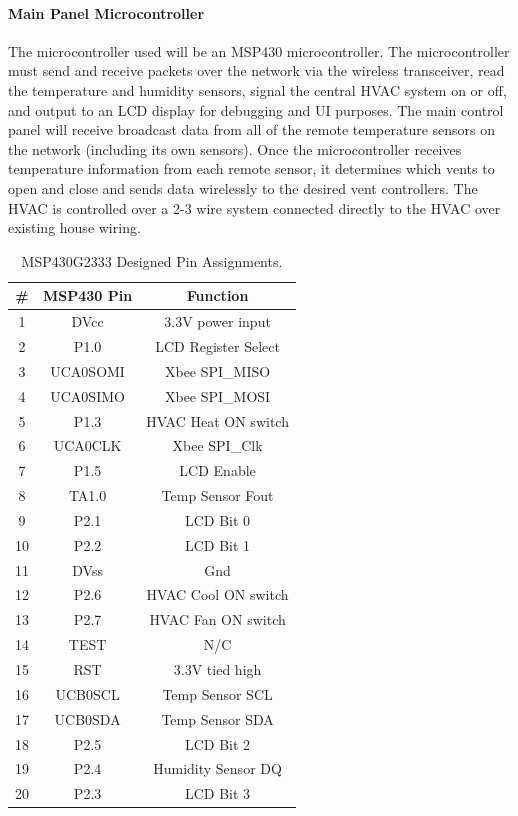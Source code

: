 \paragraph{Main Panel Microcontroller}
The microcontroller used will be an MSP430 microcontroller. The microcontroller must send and receive packets over the network via the wireless transceiver, read the temperature and humidity sensors, signal the central HVAC system on or off, and output to an LCD display for debugging and UI purposes. The main control panel will receive broadcast data from all of the remote temperature sensors on the network (including its own sensors). Once the microcontroller receives temperature information from each remote sensor, it determines which vents to open and close and sends data wirelessly to the desired vent controllers. The HVAC is controlled over a 2-3 wire system connected directly to the HVAC over existing house wiring.
\begin{table}[htbp]
\centering
\caption{MSP430G2333 Designed Pin Assignments.}
\begin{tabular}{|c|c|c|}
\hline
\textbf{\#} & \textbf{MSP430 Pin} & \textbf{Function} \bigstrut\\
\hline
\hline
1 & DVcc & 3.3V power input \bigstrut\\
\hline
2 & P1.0 & LCD Register Select \bigstrut\\
\hline
3 & UCA0SOMI & Xbee SPI\_MISO \bigstrut\\
\hline
4 & UCA0SIMO & Xbee SPI\_MOSI \bigstrut\\
\hline
5 & P1.3 & HVAC Heat ON switch \bigstrut\\
\hline
6 & UCA0CLK & Xbee SPI\_Clk \bigstrut\\
\hline
7 & P1.5 & LCD Enable \bigstrut\\
\hline
8 & TA1.0 & Temp Sensor Fout \bigstrut\\
\hline
9 & P2.1 & LCD Bit 0 \bigstrut\\
\hline
10 & P2.2 & LCD Bit 1 \bigstrut\\
\hline
11 & DVss & Gnd \bigstrut\\
\hline
12 & P2.6 & HVAC Cool ON switch \bigstrut\\
\hline
13 & P2.7 & HVAC Fan ON switch \bigstrut\\
\hline
14 & TEST & N/C \bigstrut\\
\hline
15 & RST & 3.3V tied high \bigstrut\\
\hline
16 & UCB0SCL & Temp Sensor SCL \bigstrut\\
\hline
17 & UCB0SDA & Temp Sensor SDA \bigstrut\\
\hline
18 & P2.5 & LCD Bit 2 \bigstrut\\
\hline
19 & P2.4 & Humidity Sensor DQ \bigstrut\\
\hline
20 & P2.3 & LCD Bit 3 \bigstrut\\
\hline
\end{tabular}%
\label{tab:msp_inout}%
\end{table}%

